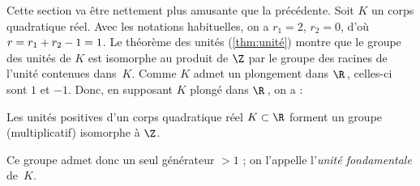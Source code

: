 \documentclass[11pt, %
  title in boldface,
  theorem in new line,
  theorem numbering = section,
  number theorems separately,
  simple name,
]{beaulivre}
\begin{document}
    Cette section va être nettement plus amusante que la précédente. Soit \( K \) un corps quadratique réel. Avec les notations habituelles, on a \( r_1 = 2 \), \( r_2 = 0 \), d'où \( r = r_1+r_2-\nobreak 1 =\nobreak 1 \). Le théorème des unités (\cref{thm:unité}) montre que le groupe des unités de \( K \) est isomorphe au produit de \( \Z \) par le groupe des racines de l'unité contenues dans~\( K \). Comme \( K \) admet un plongement dans \( \R \)\,, celles-ci sont \( 1 \) et \( -1 \). Donc, en supposant \( K \) plongé dans \( \R \)\,, on a :
    \begin{proposition}
        Les unités positives d'un corps quadratique réel \( K \subset \R \) forment un groupe (multiplicatif) isomorphe à \( \Z \).
    \end{proposition}
\noindent
    Ce groupe admet donc un seul générateur \( > 1 \) ; on l'appelle l'\emph{unité fondamentale} de~\( K \).
\end{document}
